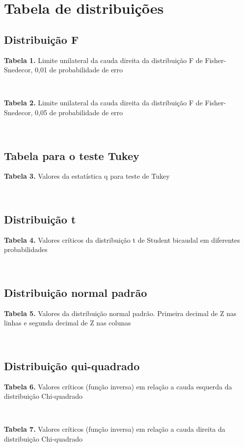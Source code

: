 \documentclass[
]{book}
\numberwithin{equation}{section}
\begin{document}
\hypertarget{tabela-de-distribuiuxe7uxf5es}{%
\chapter{Tabela de distribuições}\label{tabela-de-distribuiuxe7uxf5es}}

\hypertarget{distribuiuxe7uxe3o-f}{%
\section{Distribuição F}\label{distribuiuxe7uxe3o-f}}

\textbf{Tabela 1.} Limite unilateral da cauda direita da distribuição F de Fisher-Snedecor, 0,01 de probabilidade de erro

\(~\)
\(~\)
\(~\)

\textbf{Tabela 2.} Limite unilateral da cauda direita da distribuição F de Fisher-Snedecor, 0,05 de probabilidade de erro

\(~\)
\(~\)
\(~\)

\hypertarget{tabela-para-o-teste-tukey}{%
\section{Tabela para o teste Tukey}\label{tabela-para-o-teste-tukey}}

\textbf{Tabela 3.} Valores da estatística q para teste de Tukey

\(~\)
\(~\)
\(~\)

\hypertarget{distribuiuxe7uxe3o-t}{%
\section{Distribuição t}\label{distribuiuxe7uxe3o-t}}

\textbf{Tabela 4.} Valores críticos da distribuição t de Student bicaudal em diferentes probabilidades

\(~\)
\(~\)
\(~\)

\hypertarget{distribuiuxe7uxe3o-normal-padruxe3o}{%
\section{Distribuição normal padrão}\label{distribuiuxe7uxe3o-normal-padruxe3o}}

\textbf{Tabela 5.} Valores da distribuição normal padrão. Primeira decimal de Z nas linhas e segunda decimal de Z nas colunas

\(~\)
\(~\)
\(~\)

\hypertarget{distribuiuxe7uxe3o-qui-quadrado}{%
\section{Distribuição qui-quadrado}\label{distribuiuxe7uxe3o-qui-quadrado}}

\textbf{Tabela 6.} Valores críticos (função inversa) em relação a cauda esquerda da distribuição Chi-quadrado

\(~\)
\(~\)
\(~\)

\textbf{Tabela 7.} Valores críticos (função inversa) em relação a cauda direita da distribuição Chi-quadrado

\printindex
\printindex[function]
\end{document}
